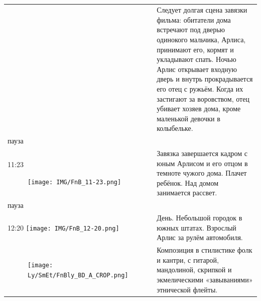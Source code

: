 \begin{longtable}[]{@{}ll@{}}
\begin{minipage}[t]{0.29\columnwidth}
\end{minipage} & \begin{minipage}[t]{0.65\columnwidth}\raggedright\strut
Следует долгая сцена завязки фильма: обитатели дома встречают под дверью
одинокого мальчика, Арлиса, принимают его, кормят и укладывают спать.
Ночью Арлис открывает входную дверь и внутрь прокрадывается его отец с ружьём.
Когда их застигают за воровством, отец убивает хозяев дома, кроме маленькой
девочки в колыбельке.\strut
\end{minipage}\tabularnewline
\begin{minipage}[t]{0.29\columnwidth}\raggedright\strut
пауза\strut
\end{minipage} & \begin{minipage}[t]{0.65\columnwidth}\raggedright\strut
\strut
\end{minipage}\tabularnewline
\begin{minipage}[t]{0.48\columnwidth}\raggedright\strut
11:23

\begin{figure}
\centering
\texttt{[image: IMG/FnB\_11-23.png]}
\caption{}
\end{figure}
\strut
\end{minipage} & \begin{minipage}[t]{0.48\columnwidth}\raggedright\strut
Завязка завершается кадром с юным Арлисом и его отцом в темноте
чужого дома. Плачет ребёнок. Над домом занимается рассвет.\strut
\end{minipage}\tabularnewline
\begin{minipage}[t]{0.29\columnwidth}\raggedright\strut
пауза\strut
\end{minipage} & \begin{minipage}[t]{0.65\columnwidth}\raggedright\strut
\strut
\end{minipage}\tabularnewline
\begin{minipage}[t]{0.29\columnwidth}\raggedright\strut
12:20
\texttt{[image: IMG/FnB\_12-20.png]}\strut
\end{minipage} & \begin{minipage}[t]{0.65\columnwidth}\raggedright\strut
День. Небольшой городок в южных штатах. Взрослый Арлис за рулём автомобиля.\strut
\end{minipage}\tabularnewline
\begin{minipage}[t]{0.29\columnwidth}\raggedright\strut
\begin{figure}
\centering
\texttt{[image: Ly/SmEt/FnBly\_BD\_A\_CROP.png]}
\caption{}
\end{figure}
\strut
\end{minipage} & \begin{minipage}[t]{0.65\columnwidth}\raggedright\strut
Композиция в стилистике фолк и кантри, с гитарой, мандолиной, скрипкой и
экмелическими «завываниями» этнической флейты.\strut
\end{minipage}\tabularnewline
\bottomrule
\end{longtable}

